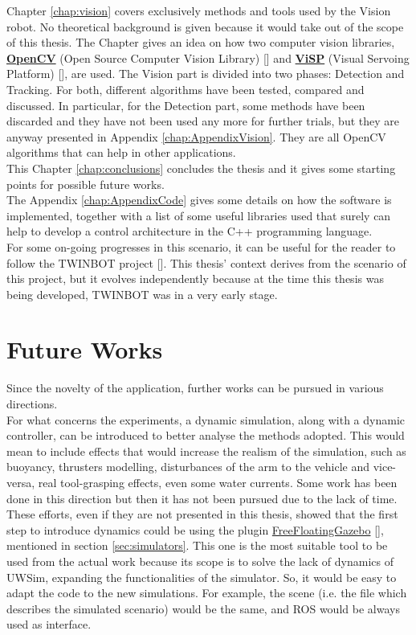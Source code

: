 Chapter \ref{chap:vision} covers exclusively methods and tools used by the Vision robot. No theoretical background is given because it would take out of the scope of this thesis. The Chapter gives an idea on how two computer vision libraries, \href{https://opencv.org/}{\textbf{OpenCV}} (Open Source Computer Vision Library) [\cite{opencv}] and \href{https://visp.inria.fr/}{\textbf{ViSP}} (Visual Servoing Platform) [\cite{visp}], are used. The Vision part is divided into two phases: Detection and Tracking. For both, different algorithms have been tested, compared and discussed. 
In particular, for the Detection part, some methods have been discarded and they have not been used any more for further trials, but they are anyway presented in Appendix \ref{chap:AppendixVision}. They are all OpenCV algorithms that can help in other applications.\\
This Chapter \ref{chap:conclusions} concludes the thesis and it gives some starting points for possible future works.\\
The Appendix \ref{chap:AppendixCode} gives some details on how the software is implemented, together with a list of some useful libraries used that surely can help to develop a control architecture in the C++ programming language.\\

For some on-going progresses in this scenario, it can be useful for the reader to follow the TWINBOT project [\cite{TWINBOT2019}]. This thesis' context derives from the scenario of this project, but it evolves independently because at the time this thesis was being developed, TWINBOT was in a very early stage.


\section{Future Works}
Since the novelty of the application, further works can be pursued in various directions.\\
For what concerns the experiments, a dynamic simulation, along with a dynamic controller, can be introduced to better analyse the methods adopted. This would mean to include effects that would increase the realism of the simulation, such as buoyancy, thrusters modelling, disturbances of the arm to the vehicle and vice-versa, real tool-grasping effects, even some water currents. Some work has been done in this direction but then it has not been pursued due to the lack of time. These efforts, even if they are not presented in this thesis, showed that the first step to introduce dynamics could be using the plugin \href{https://github.com/freefloating-gazebo/freefloating_gazebo}{FreeFloatingGazebo} [\cite{freeFloatingGazebo}], mentioned in section \ref{sec:simulators}. This one is the most suitable tool to be used from the actual work because its scope is to solve the lack of dynamics of UWSim, expanding the functionalities of the simulator. So, it would be easy to adapt the code to the new simulations. For example, the scene (i.e. the file which describes the simulated scenario) would be the same, and ROS would be always used as interface.\\

